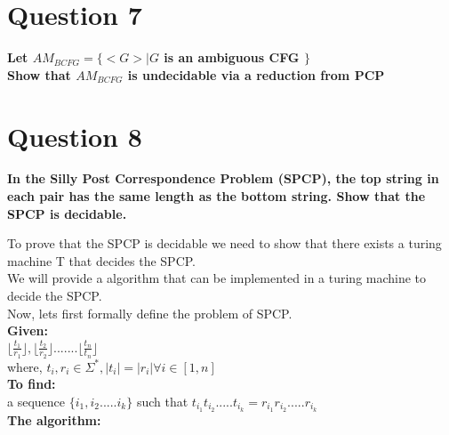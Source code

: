 \documentclass{article}
\begin{document}
\section{Question 7}

\textbf{Let $AM_{BCFG} = \{< G > | G$ is an ambiguous CFG $\}$ \\
    Show that $AM_{BCFG}$ is undecidable via a reduction from PCP\\}

\pagebreak


\section{Question 8}
\textbf{In the Silly Post Correspondence Problem (SPCP), the top string in each pair has the same
length as the bottom string. Show that the SPCP is decidable.\\}

To prove that the SPCP is decidable we need to show that there exists a turing machine T that decides the SPCP.\\
We will provide a algorithm that can be implemented in a turing machine to decide the SPCP.\\

Now, lets first formally define the problem of SPCP.\\

\textbf{Given: }\\

$\lfloor \frac{t_1}{r_1} \rfloor , \lfloor \frac{t_2}{r_2} \rfloor ....... \lfloor \frac{t_n}{t_n} \rfloor$ \\
where, $t_i , r_i \in \Sigma^* , |t_i| = |r_i| \forall i \in [1,n]$\\

\textbf{To find: } \\
a sequence $\{ i_1,i_2.....i_k \}$ such that $t_{i_1}t_{i_2}.....t_{i_k} = r_{i_1}r_{i_2}.....r_{i_k}$\\

\textbf{The algorithm: }\\
\end{document}

